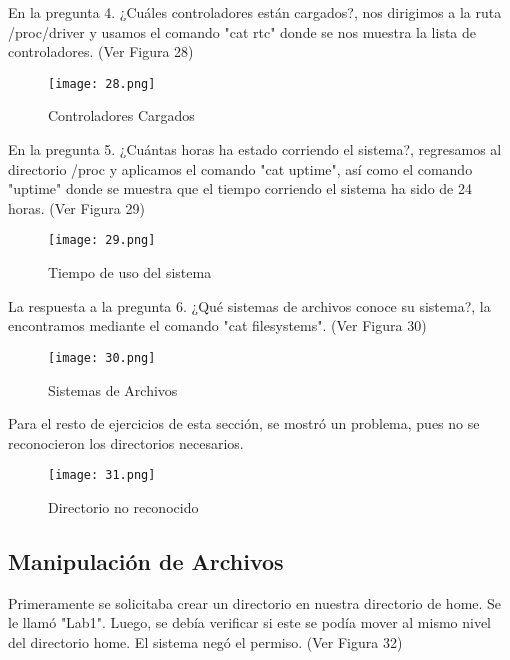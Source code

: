 \documentclass[
  letterpaper, 
  maincolor=black,
  sectioncolor=black!90,
  subsectioncolor=black!70,
  itemtextcolor=black!40,
]{fortysecondscv}
\begin{document}
{En la pregunta 4. ¿Cuáles controladores están cargados?, nos dirigimos a la ruta /proc/driver y usamos el comando "cat rtc" donde se nos muestra la lista de controladores. (Ver Figura 28)}

\begin{center}
    \begin{figure}[H]
    \centering
    \texttt{[image: 28.png]}
    \caption{Controladores Cargados}
    \label{fig:10.png}
    \end{figure}
\end{center}

{En la pregunta 5. ¿Cuántas horas ha estado corriendo el sistema?, regresamos al directorio /proc y aplicamos el comando "cat uptime", así como el comando "uptime" donde se muestra que el tiempo corriendo el sistema ha sido de 24 horas. (Ver Figura 29)}

\begin{center}
    \begin{figure}[H]
    \centering
    \texttt{[image: 29.png]}
    \caption{Tiempo de uso del sistema}
    \label{fig:10.png}
    \end{figure}
\end{center}

{La respuesta a la pregunta 6. ¿Qué sistemas de archivos conoce su sistema?, la encontramos mediante el comando "cat filesystems". (Ver Figura 30)}

\begin{center}
    \begin{figure}[H]
    \centering
    \texttt{[image: 30.png]}
    \caption{Sistemas de Archivos}
    \label{fig:10.png}
    \end{figure}
\end{center}

{Para el resto de ejercicios de esta sección, se mostró un problema, pues no se reconocieron los directorios necesarios.}

\begin{center}
    \begin{figure}[H]
    \centering
    \texttt{[image: 31.png]}
    \caption{Directorio no reconocido}
    \label{fig:10.png}
    \end{figure}
\end{center}

\subsection{Manipulación de Archivos}
{Primeramente se solicitaba crear un directorio en nuestra directorio de home. Se le llamó "Lab1". Luego, se debía verificar si este se podía mover al mismo nivel del directorio home. El sistema negó el permiso. (Ver Figura 32)}
\end{document}
